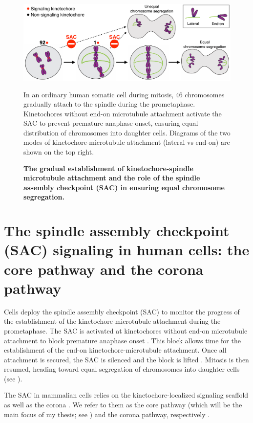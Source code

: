 \begin{figure}
    \centering
    \includegraphics[width=\textwidth]{chapters/figures/SACRole.pdf}
    \caption{\textbf{The gradual establishment of kinetochore-spindle microtubule attachment and the role of the spindle assembly checkpoint (SAC) in ensuring equal chromosome segregation.}}
    \noindent\justifying In an ordinary human somatic cell during mitosis, 46 chromosomes gradually attach to the spindle during the prometaphase. Kinetochores without end-on microtubule attachment activate the SAC to prevent premature anaphase onset, ensuring equal distribution of chromosomes into daughter cells. Diagrams of the two modes of kinetochore-microtubule attachment (lateral vs end-on) are shown on the top right.
    \label{SACRole}
\end{figure}

\section{The spindle assembly checkpoint (SAC) signaling in human cells: the core pathway and the corona pathway}
\label{TwoSACPathwaysIntro}

Cells deploy the spindle assembly checkpoint (SAC) to monitor the progress of the establishment of the kinetochore-microtubule attachment during the prometaphase. The SAC is activated at kinetochores without end-on microtubule attachment to block premature anaphase onset \cite{GSK923295MonastrolCotreatment, GSK923295LateralAttachmentEM, LateralAttachmentSAC}. This block allows time for the establishment of the end-on kinetochore-microtubule attachment. Once all attachment is secured, the SAC is silenced and the block is lifted \cite{SACActivationAndSilencing}. Mitosis is then resumed, heading toward equal segregation of chromosomes into daughter cells (see ).

The SAC in mammalian cells relies on the kinetochore-localized signaling scaffold  as well as the corona \cite{GSK923295LateralAttachmentEM, LateralAttachmentSAC, CoronaActivatesSAC}. We refer to them as the core pathway (which will be the main focus of my thesis; see ) and the corona pathway, respectively \cite{100nMNoc, eSAC}.

